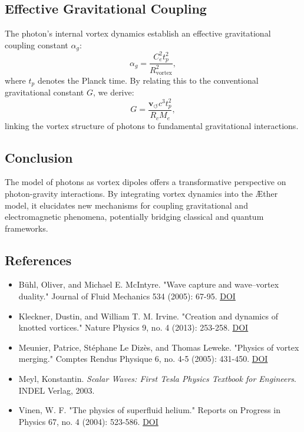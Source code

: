     \subsection*{Effective Gravitational Coupling}
    The photon's internal vortex dynamics establish an effective gravitational coupling constant $\alpha_g$:
    \begin{equation*}
        \alpha_g = \frac{C_e^2 t_p^2}{R_\text{vortex}^2},
    \end{equation*}
    where $t_p$ denotes the Planck time. By relating this to the conventional gravitational constant $G$, we derive:
    \begin{equation*}
        G = \frac{\mathbf{v}_{\scriptscriptstyle\boldsymbol{\circlearrowleft}} c^3 t_p^2}{R_c M_e},
    \end{equation*}
    linking the vortex structure of photons to fundamental gravitational interactions.

    \subsection*{Conclusion}
    The model of photons as vortex dipoles offers a transformative perspective on photon-gravity interactions. By integrating vortex dynamics into the Æther model, it elucidates new mechanisms for coupling gravitational and electromagnetic phenomena, potentially bridging classical and quantum frameworks.

    \subsection*{References}
    \begin{itemize}
        \item Bühl, Oliver, and Michael E. McIntyre. "Wave capture and wave–vortex duality." Journal of Fluid Mechanics 534 (2005): 67-95. \href{https://doi.org/10.1017/S0022112005004374}{DOI}
        \item Kleckner, Dustin, and William T. M. Irvine. "Creation and dynamics of knotted vortices." Nature Physics 9, no. 4 (2013): 253-258. \href{https://doi.org/10.1038/nphys2560}{DOI}
        \item Meunier, Patrice, Stéphane Le Dizès, and Thomas Leweke. "Physics of vortex merging." Comptes Rendus Physique 6, no. 4-5 (2005): 431-450. \href{https://doi.org/10.1016/j.crhy.2005.06.003}{DOI}
        \item Meyl, Konstantin. \textit{Scalar Waves: First Tesla Physics Textbook for Engineers}. INDEL Verlag, 2003.
        \item Vinen, W. F. "The physics of superfluid helium." Reports on Progress in Physics 67, no. 4 (2004): 523-586. \href{https://doi.org/10.1088/0034-4885/67/4/R01}{DOI}
    \end{itemize}